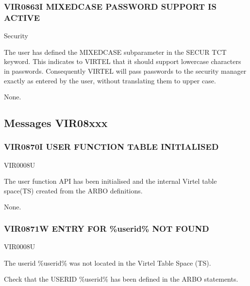 \documentclass[letterpaper,10pt,english]{sphinxmanual}
\begin{document}
\subsubsection{VIR0863I MIXED\sphinxhyphen{}CASE PASSWORD SUPPORT IS ACTIVE}
\label{\detokenize{messages:vir0863i-mixed-case-password-support-is-active}}\begin{description}
\sphinxAtStartPar
Security

\sphinxAtStartPar
The user has defined the MIXEDCASE subparameter in the SECUR TCT keyword. This indicates to VIRTEL that it should support lower\sphinxhyphen{}case characters in passwords. Consequently VIRTEL will pass passwords to the security manager exactly as entered by the user, without translating them to upper case.

\sphinxAtStartPar
None.

\end{description}


\subsection{Messages VIR08xxx}
\label{\detokenize{messages:id6}}

\subsubsection{VIR0870I USER FUNCTION TABLE INITIALISED}
\label{\detokenize{messages:vir0870i-user-function-table-initialised}}\begin{description}
\sphinxAtStartPar
VIR0008U

\sphinxAtStartPar
The user function API has been initialised and the internal Virtel table space(TS) created from the ARBO definitions.

\sphinxAtStartPar
None.

\end{description}


\subsubsection{VIR0871W ENTRY FOR \%userid\% NOT FOUND}
\label{\detokenize{messages:vir0871w-entry-for-userid-not-found}}\begin{description}
\sphinxAtStartPar
VIR0008U

\sphinxAtStartPar
The userid \%userid\% was not located in the Virtel Table Space (TS).

\sphinxAtStartPar
Check that the USERID \%userid\% has been defined in the ARBO statements.

\end{description}
\end{document}
